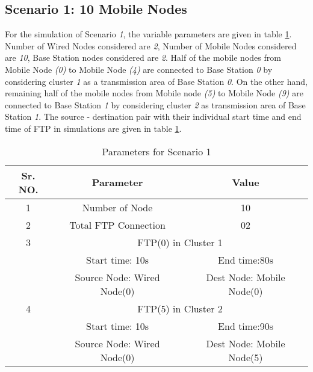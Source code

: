 \documentclass[3p,times]{elsarticle}
\begin{document}
\subsection{Scenario 1: 10 Mobile Nodes}
For the simulation of Scenario \emph{1}, the variable parameters are given in table \ref {t3}. Number of Wired Nodes considered are \emph{2}, Number of Mobile Nodes considered are \emph{10}, Base Station nodes considered are \emph{2}. Half of the mobile nodes from Mobile Node \emph{(0)} to Mobile Node \emph{(4)} are connected to Base Station \emph{0} by considering cluster \emph{1} as a transmission area of Base Station \emph{0}. On the other hand, remaining half of the mobile nodes from Mobile node \emph{(5)} to Mobile Node \emph{(9)} are connected to  Base Station \emph{1} by considering cluster \emph{2} as transmission area of Base Station \emph{1}. The source - destination pair with their individual start time and end time of FTP in simulations are given in table \ref {t3}.
\begin{table}[t]
\centering
\caption{Parameters for Scenario 1}
\begin{tabular}{|c|c|c|}
\hline
Sr. NO. & Parameter & Value \\
\hline
1 & Number of Node & 10 \\
2 & Total FTP Connection & 02 \\
\hline
3 & \multicolumn{2}{|c|}{ FTP(0) in Cluster 1} \\
 & Start time: 10s &  End time:80s\\
 & Source Node: Wired Node(0) & Dest Node: Mobile Node(0) \\
\hline
4 & \multicolumn{2}{|c|}{ FTP(5) in Cluster 2} \\
 & Start time: 10s &  End time:90s\\
 & Source Node: Wired Node(0) & Dest Node: Mobile Node(5) \\
\hline
\end{tabular}
\label{t3}
\end{table}
\end{document}
